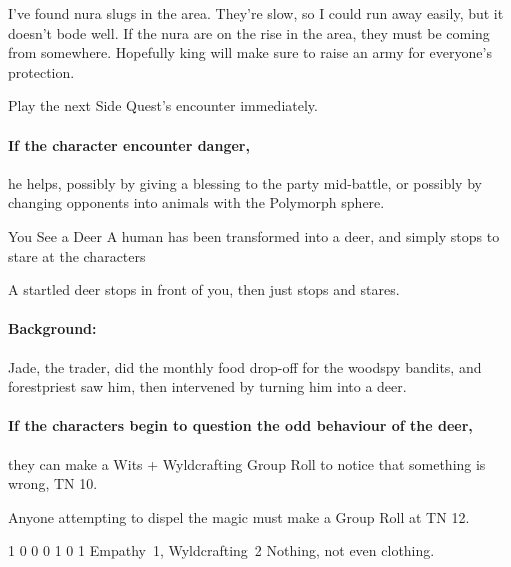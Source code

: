 \begin{multicols}{2}
\begin{speechtext}

  I've found nura slugs in the area.
  They're slow, so I could run away easily, but it doesn't bode well.
  If the nura are on the rise in the area, they must be coming from somewhere.
  Hopefully \gls{king} will make sure to raise an army for everyone's protection.

\end{speechtext}

Play the next Side Quest's encounter immediately.
\paragraph{If the character encounter danger,}
he helps, possibly by giving a blessing to the party mid-battle, or possibly by changing opponents into animals with the Polymorph sphere.

\forestpriest

{You See a Deer}%
{A human has been transformed into a deer, and simply stops to stare at the characters}%

\begin{boxtext}

  A startled deer stops in front of you, then just stops and stares.

\end{boxtext}

\paragraph{Background:}
Jade, the trader, did the monthly food drop-off for the woodspy bandits, and \gls{forestpriest} saw him, then intervened by turning him into a deer.

\paragraph{If the characters begin to question the odd behaviour of the deer,}
they can make a Wits + Wyldcrafting Group Roll to notice that something is wrong, TN 10.

Anyone attempting to dispel the magic must make a Group Roll at TN 12.

  {1}%
  {0}%
  {{0}%
  {0}%
  {1}}%
  {0}%
  {1}%
  {Empathy~1, Wyldcrafting~2}%
  {Nothing, not even clothing.}%
  {}


\end{multicols}

